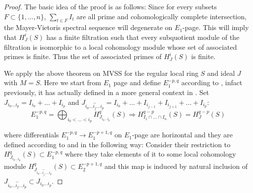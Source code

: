 \documentclass[10pt]{amsart}
\theoremstyle{plain}
\theoremstyle{definition}
\newcommand{\ideal}[1]{\mathfrak{#1}}
\newcommand{\n}{\ideal{n}}
\newcommand{\func}[1]{\mathrm{#1} \,}
\newcommand{\height}{\func{ht}}
\begin{document}
\begin{proof}

The basic idea of the proof is as follows: Since for every subsets $F\subset\{1,\dots,n\}$, $\sum_{t\in F}I_t$ are all prime and cohomologically complete intersection, the Mayer-Vietoris spectral sequence will degenerate on $E_1$-page. This will imply that $H^i_{J} (S)$ has a finite filtration such that every subquotient module of the filtration is isomorphic to a local cohomology module whose set of associated primes is finite. Thus the set of associated primes of $H^i_{J} (S)$ is finite. 

We apply the above theorem on MVSS for the regular local ring $S$ and ideal $J$ with $M=S$. Here we start from $E_1$ page and define $E_1^{-p,q}$ according to \cite{Ly4}, infact previously, it has actually defined in a more general context in \cite{AGZ}. Set $J_{i_0\ldots i_p}=I_{i_0}+\dots+I_{i_p}$ and $J_{i_0\ldots\widehat{i_j}\ldots i_p}=I_{i_0}+\dots+I_{i_{j-1}}+I_{i_{j+1}}+\dots+I_{i_p}$:
$$E_1^{-p,q}=\bigoplus_{i_0<\dots<i_p}H^q_{J_{i_0\ldots i_p}}(S)
\Longrightarrow H^{q-p}_{I_1\cap\dots\cap I_n}(S)= H^{q-p}_{J}(S)$$

where differentials $E_1^{-p,q}\to E_1^{-p+1,q}$ on $E_1$-page are horizontal and they are defined according to \cite{Ly4} and in the following way: Consider their restriction to $H^q_{J_{i_0\ldots i_p}}(S)\subset E_1^{-p,q}$ where they take elements of it to some local cohomology module $H^{q}_{J_{i_0\ldots\widehat{i_j}\ldots,i_p}}(S)\subset E_2^{-p+1,q}$ and this map is induced by natural inclusion of $J_{i_0\ldots\widehat{i_j}\ldots i_p}\subset J_{i_0\ldots i_p}$. 



\end{proof}
\end{document}
